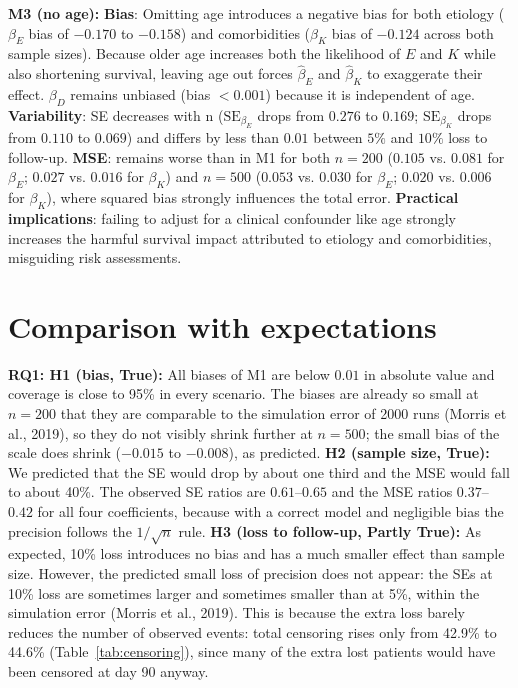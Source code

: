 \documentclass[10pt,a4paper]{article}
\begin{document}
\textbf{M3 (no age):} \textbf{Bias}: Omitting age introduces a negative bias for both etiology ($\beta_E$ bias of $-0.170$ to $-0.158$) and comorbidities ($\beta_K$ bias of $-0.124$ across both sample sizes). Because older age increases both the likelihood of $E$ and $K$ while also shortening survival, leaving age out forces $\hat{\beta}_E$ and $\hat{\beta}_K$ to exaggerate their effect. $\beta_D$ remains unbiased (bias $<0.001$) because it is independent of age. \textbf{Variability}: SE decreases with n ($\text{SE}_{\beta_E}$ drops from $0.276$ to $0.169$; $\text{SE}_{\beta_K}$ drops from $0.110$ to $0.069$) and differs by less than $0.01$ between $5\%$ and $10\%$ loss to follow-up. \textbf{MSE}: remains worse than in M1 for both $n=200$ ($0.105$ vs. $0.081$ for $\beta_E$; $0.027$ vs. $0.016$ for $\beta_K$) and $n=500$ ($0.053$ vs. $0.030$ for $\beta_E$; $0.020$ vs. $0.006$ for $\beta_K$), where squared bias strongly influences the total error. \textbf{Practical implications}: failing to adjust for a clinical confounder like age strongly increases the harmful survival impact attributed to etiology and comorbidities, misguiding risk assessments.

\section{Comparison with expectations}
\textbf{RQ1: H1 (bias, True):} All biases of M1 are below $0.01$ in absolute value and coverage is close to 95\% in every scenario. The biases are already so small at $n=200$ that they are comparable to the simulation error of 2000 runs (Morris et al., 2019), so they do not visibly shrink further at $n=500$; the small bias of the scale does shrink ($-0.015$ to $-0.008$), as predicted.
\textbf{H2 (sample size, True):} We predicted that the SE would drop by about one third and the MSE would fall to about 40\%. The observed SE ratios are $0.61$--$0.65$ and the MSE ratios $0.37$--$0.42$ for all four coefficients, because with a correct model and negligible bias the precision follows the $1/\sqrt n$ rule.
\textbf{H3 (loss to follow-up, Partly True):} As expected, 10\% loss introduces no bias and has a much smaller effect than sample size. However, the predicted small loss of precision does not appear: the SEs at 10\% loss are sometimes larger and sometimes smaller than at 5\%, within the simulation error (Morris et al., 2019). This is because the extra loss barely reduces the number of observed events: total censoring rises only from 42.9\% to 44.6\% (Table~\ref{tab:censoring}), since many of the extra lost patients would have been censored at day 90 anyway.
\end{document}
